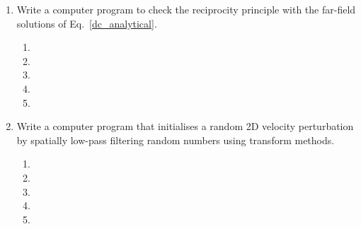\begin{enumerate}
\begin{enumerate}
\item[] 
\item[]
\item[] 
\item[]
\item[] 
\end{enumerate}
\item
Write a computer program to check the reciprocity principle with the far-field solutions of Eq.~\ref{dc_analytical}. 
\begin{enumerate}
\item[]
\item[]
\item[] 
\item[]
\item[] 
\end{enumerate}
\item
Write a computer program that initialises a random 2D velocity perturbation by spatially low-pass filtering random numbers using transform methods. 
\begin{enumerate}
\item[]
\item[]
\item[] 
\item[]
\item[] 
\end{enumerate}
\end{enumerate}